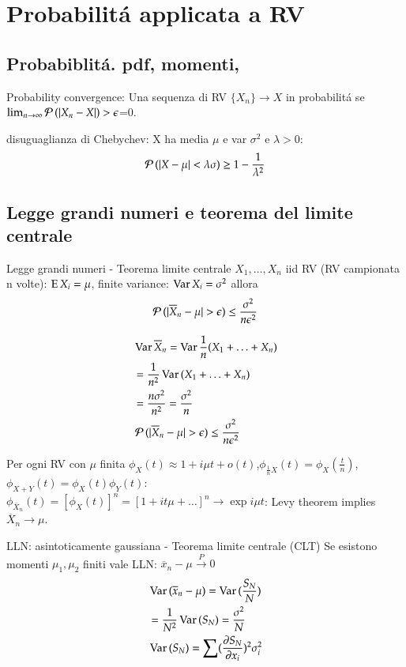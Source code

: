 \documentclass[main.tex]{subfiles}
\begin{document}
\chapter{Probabilit\'a applicata a RV}

\section{Probabiblit\'a. pdf, momenti, }

Probability convergence: Una sequenza di RV $\{X_n\}\to X$ in probabilit\'a se $\lim_{n\to\infty}\prob{(|X_n-X|)>\epsilon}$=0.

disuguaglianza di Chebychev: X ha media $\mu$ e var $\sigma^2$ e $\lambda>0$:
\[\prob{(|X-\mu|<\lambda\sigma)}\geq1-\frac{1}{\lambda^2}\]

\section{Legge grandi numeri e teorema del limite centrale}


Legge grandi numeri - Teorema limite centrale
$X_1,\ldots,X_n$ iid RV (RV campionata n volte): $\E{X_i}=\mu$, finite variance: $\var{X_i}=\sigma^2$ allora \[\prob{(|\overline{X}_n-\mu|>\epsilon)}\leq\frac{\sigma^2}{n\epsilon^2}\]

\begin{align*}
&\var{\overline{X}_n}=\var{\frac{1}{n}(X_1+\ldots+X_n)}\\
&=\frac{1}{n^2}\var{(X_1+\ldots+X_n)}\\
&=\frac{n\sigma^2}{n^2}=\frac{\sigma^2}{n}\\
&\prob{(|\overline{X}_n-\mu|>\epsilon)}\leq\frac{\sigma^2}{n\epsilon^2}
\end{align*}

Per ogni RV con $\mu$ finita $\phi_X(t)\approx1+i\mu t+o(t)$,$\phi_{\frac{1}{n}X}(t)=\phi_X(\frac{t}{n})$, $\phi_{X+Y}(t)=\phi_X(t)\phi_Y(t)$:
$\phi_{\overline{X}_n}(t)=[\phi_X(t)]^n=[1+it\mu+\ldots]^n\to\exp{i\mu t}$: Levy theorem implies $\overline{X}_n\to\mu$.

LLN: asintoticamente gaussiana - Teorema limite centrale (CLT)
Se esistono momenti $\mu_1, \mu_2$ finiti vale LLN: $\overline{x}_n-\mu\xrightarrow{P}0$
\begin{align*}
&\var{(\overline{x}_n-\mu)}=\var{(\frac{S_N}{N})}\\
&=\frac{1}{N^2}\var{(S_N)}=\frac{\sigma^2}{N}\\
&\var{(S_N)}=\sum(\PDy{x_i}{S_N})^2\sigma_i^2
\end{align*}
\end{document}
